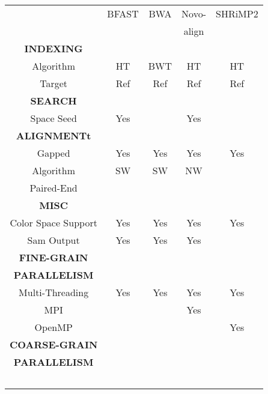 \documentclass{sig-alternate}
\begin{document}
\begin{table}
 \small
\begin{tabular}{|c|c|c|c|c|} 
  \hline  
& BFAST  & BWA & Novo- & SHRiMP2  \\  
&  &  & align & \\ \hline \hline
\textbf{INDEXING}  & & & &  \\
 Algorithm & HT & BWT & HT & HT \\
 Target & Ref & Ref & Ref & Ref \\ \hline
\textbf{SEARCH} & & & & \\
Space Seed & Yes &   &  Yes & \\ \hline
\textbf{ALIGNMENTt} &  & & & \\
Gapped & Yes & Yes & Yes & Yes \\ 
Algorithm & SW & SW & NW & \\ 
Paired-End &  &  &  & \\ \hline
\textbf{MISC}  &  &  &  & \\
Color Space Support  & Yes & Yes & Yes & Yes  \\
Sam Output & Yes & Yes & Yes &   \\ \hline
\textbf{FINE-GRAIN} &  &  &  & \\ 
 \textbf{PARALLELISM} & & & & \\
Multi-Threading & Yes & Yes & Yes & Yes\\ 
MPI & & & Yes &\\
OpenMP &  & &  & Yes \\  \hline
\textbf{COARSE-GRAIN}  & & & &\\ 
\textbf{PARALLELISM} & & & & \\\
& & & &  \\ \hline
\end{tabular} 


\end{table}
\end{document}
